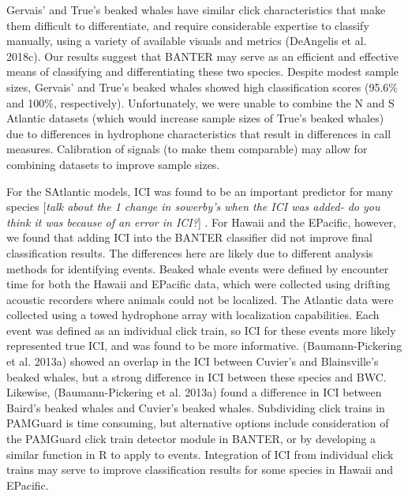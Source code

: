 \documentclass[
  letterpaper,
  DIV=11,
  numbers=noendperiod]{scrartcl}
\begin{document}
Gervais' and True's beaked whales have similar click characteristics
that make them difficult to differentiate, and require considerable
expertise to classify manually, using a variety of available visuals and
metrics (DeAngelis et al. 2018c). Our results suggest that BANTER may
serve as an efficient and effective means of classifying and
differentiating these two species. Despite modest sample sizes, Gervais'
and True's beaked whales showed high classification scores (95.6\% and
100\%, respectively). Unfortunately, we were unable to combine the N and
S Atlantic datasets (which would increase sample sizes of True's beaked
whales) due to differences in hydrophone characteristics that result in
differences in call measures. Calibration of signals (to make them
comparable) may allow for combining datasets to improve sample sizes.

For the SAtlantic models, ICI was found to be an important predictor for
many species {[}\emph{talk about the 1 change in sowerby's when the ICI
was added- do you think it was because of an error in ICI?}{]} . For
Hawaii and the EPacific, however, we found that adding ICI into the
BANTER classifier did not improve final classification results. The
differences here are likely due to different analysis methods for
identifying events. Beaked whale events were defined by encounter time
for both the Hawaii and EPacific data, which were collected using
drifting acoustic recorders where animals could not be localized. The
Atlantic data were collected using a towed hydrophone array with
localization capabilities. Each event was defined as an individual click
train, so ICI for these events more likely represented true ICI, and was
found to be more informative. (Baumann-Pickering et al. 2013a) showed an
overlap in the ICI between Cuvier's and Blainsville's beaked whales, but
a strong difference in ICI between these species and BWC. Likewise,
(Baumann-Pickering et al. 2013a) found a difference in ICI between
Baird's beaked whales and Cuvier's beaked whales. Subdividing click
trains in PAMGuard is time consuming, but alternative options include
consideration of the PAMGuard click train detector module in BANTER, or
by developing a similar function in R to apply to events. Integration of
ICI from individual click trains may serve to improve classification
results for some species in Hawaii and EPacific.
\end{document}
